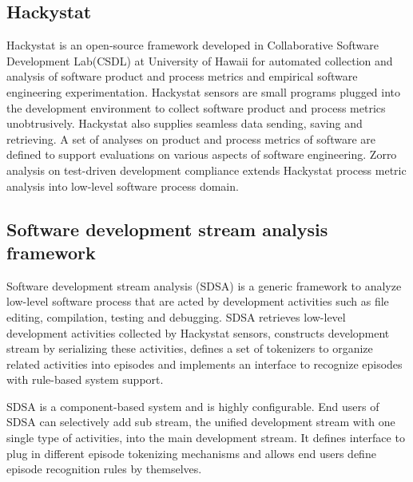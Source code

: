 \subsection{Hackystat}
Hackystat\cite{Hackystat} is an open-source framework developed in
Collaborative Software Development Lab(CSDL) at University of Hawaii for
automated collection and analysis of software product and process metrics
and empirical software engineering experimentation. Hackystat sensors are
small programs plugged into the development environment to collect software
product and process metrics unobtrusively. Hackystat also supplies seamless
data sending, saving and retrieving. A set of analyses on product and
process metrics of software are defined to support evaluations on various
aspects of software engineering. Zorro analysis on test-driven development
compliance extends Hackystat process metric analysis into low-level
software process domain.

\subsection{Software development stream analysis framework}
Software development stream analysis (SDSA) is a generic framework to
analyze low-level software process that are acted by development
activities such as file editing, compilation, testing and debugging. SDSA
retrieves low-level development activities collected by Hackystat sensors,
constructs development stream by serializing these activities, defines a
set of tokenizers to organize related activities into episodes and
implements an interface to recognize episodes with rule-based system
support.

SDSA is a component-based system and is highly configurable. End users of
SDSA can selectively add sub stream, the unified development stream with
one single type of activities, into the main development stream. It defines
interface to plug in different episode tokenizing mechanisms and allows end
users define episode recognition rules by themselves.

